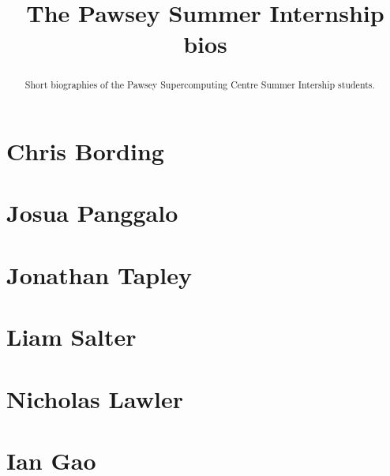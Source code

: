 \documentclass[11pt,a4paper]{report}
\title{The Pawsey Summer Internship bios}
\begin{document}
\maketitle
\tableofcontents


\begin{abstract}

Short biographies of the Pawsey Supercomputing Centre Summer Intership students.

\end{abstract}

\chapter{Chris Bording}


\chapter{Josua Panggalo}




\chapter{Jonathan Tapley}


\chapter{Liam Salter}


\chapter{Nicholas Lawler}


\chapter{Ian Gao}

\end{document}
